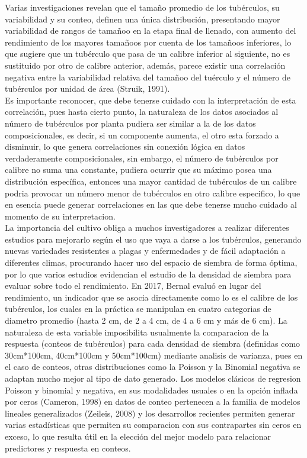 Varias investigaciones revelan que el tamaño promedio de los tubérculos, su variabilidad y su conteo, definen una única distribución, presentando mayor variabilidad de rangos de tamañoo en la etapa final de llenado, con aumento del rendimiento de los mayores tamañoos por cuenta de los tamañoos inferiores, lo que sugiere que un tubérculo que pasa de un calibre inferior al siguiente, no es sustituido por otro de calibre anterior, además, parece existir una correlación negativa entre la variabilidad relativa del tamañoo del tuérculo y el número de tubérculos por unidad de área (Struik, 1991).\\

Es importante reconocer, que debe tenerse cuidado con la interpretación de esta correlación, pues hasta cierto punto, la naturaleza de los datos asociados al número de tubérculos por planta pudiera ser similar a la de los datos composicionales, es decir, si un componente aumenta, el otro esta forzado a disminuir, lo que genera correlaciones sin conexión lógica en datos verdaderamente composicionales, sin embargo, el número de tubérculos por calibre no suma una constante, pudiera ocurrir que su máximo posea una distribución específica, entonces una mayor cantidad de tubérculos de un calibre podria provocar un número menor de tubérculos en otro calibre especifico, lo que en esencia puede generar correlaciones en las que debe tenerse mucho cuidado al momento de su interpretacion.\\

 La importancia del cultivo obliga a muchos investigadores a realizar diferentes estudios para mejorarlo según el uso que vaya a darse a los tubérculos, generando nuevas variedades resistentes a plagas y enfermedades y de fácil adaptación a diferentes climas, procurando hacer uso del espacio de siembra de forma óptima, por lo que varios estudios evidencian el estudio de la densidad de siembra para evaluar sobre todo el rendimiento. En 2017, Bernal evaluó en lugar del rendimiento, un indicador que se asocia directamente como lo es el calibre de los tubérculos, los cuales en la práctica se manipulan en cuatro categorias de diametro promedio (hasta 2 cm, de 2 a 4 cm, de 4 a 6 cm y más de 6 cm). La naturaleza de esta variable imposibilita usualmente la comparacion de la respuesta (conteos de tubérculos) para cada densidad de siembra (definidas como 30cm*100cm, 40cm*100cm y 50cm*100cm) mediante analisis de varianza, pues en el caso de conteos, otras distribuciones como la Poisson y la Binomial negativa se adaptan mucho mejor al tipo de dato generado. Los modelos clásicos de regresion Poisson y binomial y negativa, en sus modalidades usuales o en la opción inflada por ceros (Cameron, 1998) en datos de conteo pertenecen a la familia de modelos lineales generalizados (Zeileis, 2008) y los desarrollos recientes permiten generar varias estadísticas que permiten su comparacion con sus contrapartes sin ceros en exceso, lo que resulta útil en la elección del mejor modelo para relacionar predictores y respuesta en conteos.\\

